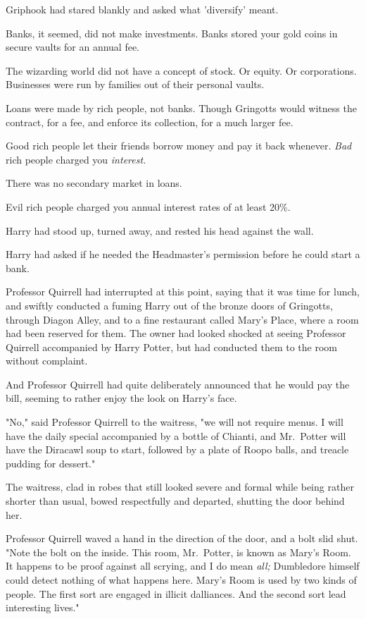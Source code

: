 Griphook had stared blankly and asked what 'diversify' meant.

Banks, it seemed, did not make investments. Banks stored your gold coins in 
secure vaults for an annual fee.

The wizarding world did not have a concept of stock. Or equity. Or 
corporations. Businesses were run by families out of their personal vaults.

Loans were made by rich people, not banks. Though Gringotts would witness the 
contract, for a fee, and enforce its collection, for a much larger fee.

Good rich people let their friends borrow money and pay it back whenever. 
\emph{Bad} rich people charged you \emph{interest.}

There was no secondary market in loans.

Evil rich people charged you annual interest rates of at least 20\%.

Harry had stood up, turned away, and rested his head against the wall.

Harry had asked if he needed the Headmaster's permission before he could start 
a bank.

Professor Quirrell had interrupted at this point, saying that it was time for 
lunch, and swiftly conducted a fuming Harry out of the bronze doors of 
Gringotts, through Diagon Alley, and to a fine restaurant called Mary's Place, 
where a room had been reserved for them. The owner had looked shocked at seeing 
Professor Quirrell accompanied by Harry Potter, but had conducted them to the 
room without complaint.

And Professor Quirrell had quite deliberately announced that he would pay the 
bill, seeming to rather enjoy the look on Harry's face.

"No," said Professor Quirrell to the waitress, "we will not require menus. I 
will have the daily special accompanied by a bottle of Chianti, and Mr.~Potter 
will have the Diracawl soup to start, followed by a plate of Roopo balls, and 
treacle pudding for dessert."

The waitress, clad in robes that still looked severe and formal while being 
rather shorter than usual, bowed respectfully and departed, shutting the door 
behind her.

Professor Quirrell waved a hand in the direction of the door, and a bolt slid 
shut. "Note the bolt on the inside. This room, Mr.~Potter, is known as Mary's 
Room. It happens to be proof against all scrying, and I do mean \emph{all;} 
Dumbledore himself could detect nothing of what happens here. Mary's Room is 
used by two kinds of people. The first sort are engaged in illicit dalliances. 
And the second sort lead interesting lives."

